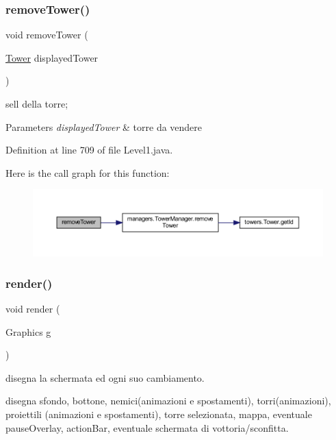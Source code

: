 \subsubsection{\texorpdfstring{remove\+Tower()}{removeTower()}}
{\footnotesize\ttfamily void remove\+Tower (\begin{DoxyParamCaption}\item[{\hyperlink{classtowers_1_1_tower}{Tower}}]{displayed\+Tower }\end{DoxyParamCaption})}



sell della torre; 


\begin{DoxyParams}{Parameters}
{\em displayed\+Tower} & torre da vendere \\
\hline
\end{DoxyParams}


Definition at line 709 of file Level1.\+java.

Here is the call graph for this function\+:
\nopagebreak
\begin{figure}[H]
\begin{center}
\leavevmode
\includegraphics[width=350pt]{classscenes_1_1_level1_addba85b44e35a186e066b2e801f433c4_cgraph}
\end{center}
\end{figure}
\mbox{\label{classscenes_1_1_level1_a203b6ad9d5e4d54dd1152986eec4dedc}} 
\subsubsection{\texorpdfstring{render()}{render()}}
{\footnotesize\ttfamily void render (\begin{DoxyParamCaption}\item[{Graphics}]{g }\end{DoxyParamCaption})}



disegna la schermata ed ogni suo cambiamento. 

disegna sfondo, bottone, nemici(animazioni e spostamenti), torri(animazioni), proiettili (animazioni e spostamenti), torre selezionata, mappa, eventuale pause\+Overlay, action\+Bar, eventuale schermata di vottoria/sconfitta.


